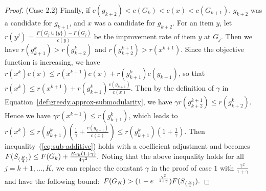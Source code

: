 \begin{proof}
(Case 2.2) 
Finally, if \mbox{$c(g_{k+2}) < c(G_k) < c(x) < c(G_{k+1})$},
$g_{k+2}$ was a candidate for $g_{k+1}$, and $x$ was a candidate for 
$g_{k+2}$. 
For an item $y$, let 
\mbox{$r(y^j)= \frac{F(G_{j} \cup \{ y \}) - F(G_j)}{c(y)}$} 
be the improvement rate of item $y$ at $G_j$. 
Then we have \mbox{$r(g_{k+1}^k) > r(g_{k+2}^k)$} and \mbox{$r(g_{k+2}^{k+1}) > r(x^{k+1})$}. 
Since the objective function is increasing, we have 
\mbox{$r(x^k) c(x) \leq r(x^{k+1})c(x) + r(g_{k+1}^k)c(g_{k+1})$},
so that 
\mbox{$r(x^k) \leq r(x^{k+1}) + r(g_{k+1}^k) \frac{c(g_{k+1})}{c(x)}$}.
Then by the definition of $\gamma$ in Equation~\ref{def:greedy.approx-submodularity}, we have 
$ \gamma r(g^{k+1}_{k+2}) \leq r(g_{k+2}^k)$. Hence we have 
$ \gamma r(x^{k+1}) \leq  r(g_{k+1}^k)$, which leads to 
\mbox{$r (x^k) \leq r(g_{k+1}^k) (\frac{1}{\gamma} + \frac{c(g_{k+1})}{c(x)} ) \leq r(g_{k+1}^k) (1 + \frac{1}{\gamma})$}. Then
inequality~(\ref{eq:sub-additive}) holds with a coefficient adjustment and becomes
$
F(S_{\langle \frac{B}{4} \rangle}) \leq F(G_k) + \frac{B s_k (1+\gamma)}{4 \gamma^2}.
$
Noting that the above inequality holds for all $j=k+1, ..., K$, we can replace the constant $\gamma$ in the 
proof of case $1$ with $\frac{\gamma^2}{1+\gamma}$ and have the following bound:\mbox{
$
F(G_K) > (1 - e^{-\frac{\gamma^2}{1+\gamma} }) F(S_{\langle \frac{B}{4} \rangle}).
$}

\end{proof}
